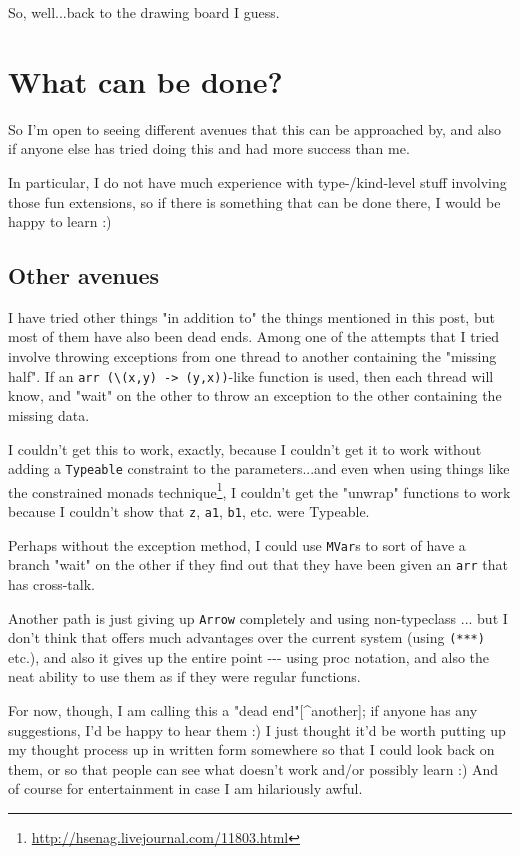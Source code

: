 \documentclass[]{article}
\renewcommand{\href}[2]{#2\footnote{\url{#1}}}
\begin{document}
So, well...back to the drawing board I guess.

\section{What can be done?}

So I'm open to seeing different avenues that this can be approached by, and also
if anyone else has tried doing this and had more success than me.

In particular, I do not have much experience with type-/kind-level stuff
involving those fun extensions, so if there is something that can be done there,
I would be happy to learn :)

\subsection{Other avenues}

I have tried other things "in addition to" the things mentioned in this post,
but most of them have also been dead ends. Among one of the attempts that I
tried involve throwing exceptions from one thread to another containing the
"missing half". If an
\texttt{arr\ (\textbackslash{}(x,y)\ -\textgreater{}\ (y,x))}-like function is
used, then each thread will know, and "wait" on the other to throw an exception
to the other containing the missing data.

I couldn't get this to work, exactly, because I couldn't get it to work without
adding a \texttt{Typeable} constraint to the parameters...and even when using
things like the \href{http://hsenag.livejournal.com/11803.html}{constrained
monads technique}, I couldn't get the "unwrap" functions to work because I
couldn't show that \texttt{z}, \texttt{a1}, \texttt{b1}, etc. were Typeable.

Perhaps without the exception method, I could use \texttt{MVar}s to sort of have
a branch "wait" on the other if they find out that they have been given an
\texttt{arr} that has cross-talk.

Another path is just giving up \texttt{Arrow} completely and using non-typeclass
... but I don't think that offers much advantages over the current system (using
\texttt{(***)} etc.), and also it gives up the entire point -\/-\/- using proc
notation, and also the neat ability to use them as if they were regular
functions.

For now, though, I am calling this a "dead end"{[}\^{}another{]}; if anyone has
any suggestions, I'd be happy to hear them :) I just thought it'd be worth
putting up my thought process up in written form somewhere so that I could look
back on them, or so that people can see what doesn't work and/or possibly learn
:) And of course for entertainment in case I am hilariously awful.
\end{document}
